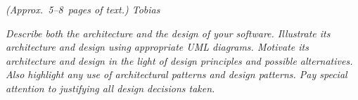 \flushleft
\emph{(Approx.~5--8~pages of text.) Tobias}

\emph{Describe both the architecture and the design of your 
software. Illustrate its architecture and design using appropriate UML diagrams. 
Motivate its architecture and design in the light of design principles and 
possible alternatives. Also highlight any use of architectural 
patterns and design patterns. Pay special attention to justifying all design 
decisions taken.}
